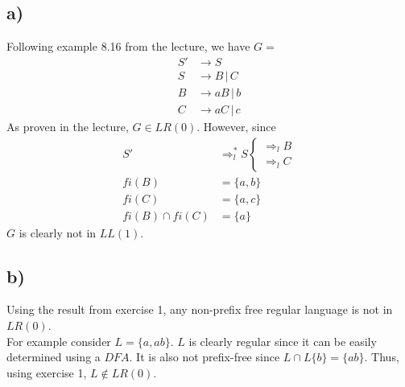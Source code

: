 \subsection*{a)}
Following example 8.16 from the lecture, we have $G =$
\begin{equation*}
\begin{split}
	S' &\rightarrow S \\
	S &\rightarrow B \,|\, C \\
	B &\rightarrow aB \,|\, b \\
	C &\rightarrow aC \,|\, c
\end{split}
\end{equation*}
As proven in the lecture, $G \in LR(0)$. However, since
\begin{equation*}
\begin{split}
	S' &\Rightarrow_l^* S \begin{cases}\Rightarrow_l B\\ \Rightarrow_l C\end{cases} \\
	fi(B) &= \{ a, b\} \\
	fi(C) &= \{ a, c\} \\
	fi(B) \cap fi(C) &= \{ a\}
\end{split}
\end{equation*}
$G$ is clearly not in $LL(1)$.

\subsection*{b)}
Using the result from exercise 1, any non-prefix free regular language is not in $LR(0)$.\\
For example consider $L = \{ a, ab\}$. $L$ is clearly regular since it can be easily determined using a $DFA$. It is also not prefix-free since $L \cap L\{ b\} = \{ ab \}$. Thus, using exercise 1, $L \not\in LR(0)$.